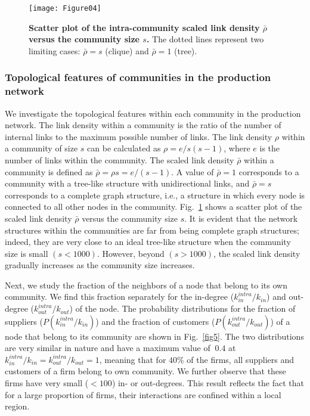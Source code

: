 \documentclass[pre,floatfix,twocolumn,showpacs,a4paper,nofootinbib]{revtex4}
\begin{document}
\begin{figure}[t]
\begin{center}
\texttt{[image: Figure04]}
\end{center}
\caption{
{\bf Scatter plot of the intra-community scaled link density $\bar{\rho}$ versus the community size $s$.}
The dotted lines represent two limiting cases: $\bar{\rho} = s$ (clique) and $\bar{\rho} = 1$ (tree).
}
\label{fig4}
\end{figure}

\subsubsection{Topological features of communities in the production network}
We investigate the topological features within each community in the production network. The link density within a community is
the ratio of the number of internal links to the maximum possible number of links. The link density $\rho$ within a community of
size $s$ can be calculated as  $\rho = e/s(s-1)$, where $e$ is the number of links within the community. The scaled link density $\bar{\rho}$
within a community is defined as $\bar{\rho} = \rho s = e/(s-1)$. A value of $\bar{\rho} = 1$ corresponds to a community with a tree-like structure
with unidirectional links, and $\bar{\rho} = s$ corresponds to a complete graph structure, i.e., a structure in which every node is connected to all other nodes in the community. 
Fig.~\ref{fig4} shows a scatter plot of the scaled link density $\bar{\rho}$ versus the community size $s$. It is evident that the network structures within the
communities are far from being complete graph structures; indeed, they are very close to an ideal tree-like structure when the community size is small $(s < 1000)$.
However, beyond $(s > 1000)$, the scaled link density gradually increases as the community size increases. 

Next, we study the fraction of the neighbors of a node that belong to its own community. We find this fraction separately for the in-degree ($k_{in}^{intra} / k_{in}$) 
and out-degree ($k_{out}^{intra} / k_{out}$)  of the node. 
The probability distributions for the fraction of suppliers ($P(k_{in}^{intra} / k_{in})$) and the fraction of customers ($P(k_{out}^{intra} / k_{out})$) of a node
that belong to its community are shown in Fig.~\ref{fig5}. The two distributions are very similar in nature and have a maximum value of $~0.4$ at
$k_{in}^{intra} / k_{in} = k_{out}^{intra} / k_{out}=1 $, meaning that for $40\%$ of the firms, all suppliers and customers of a firm belong to own community. 
We further observe that these firms have very small ($<100$) in- or out-degrees.  
This result reflects the fact that for a large proportion of firms, their interactions are confined within a local region.  
\end{document}
